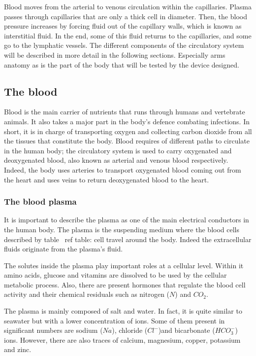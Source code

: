 Blood moves from the arterial to venous circulation within the capillaries. Plasma passes through capillaries that are only a thick cell in diameter. Then, the blood pressure increases by forcing fluid out of the capillary walls, which is known as interstitial fluid. In the end, some of this fluid returns to the capillaries, and some go to the lymphatic vessels. The different components of the circulatory system will be described in more detail in the following sections. Especially arms anatomy as is the part of the body that will be tested by the device designed. 

\subsection{The blood}
Blood is the main carrier of nutrients that runs through humans and vertebrate animals. It also takes a major part in the body's defence combating infections. In short, it is in charge of transporting oxygen and collecting carbon dioxide from all the tissues that constitute the body.  Blood requires of different paths to circulate in the human body; the circulatory system is used to carry oxygenated and deoxygenated blood, also known as arterial and venous blood respectively. Indeed, the body uses arteries to transport oxygenated blood coming out from the heart and uses veins to return deoxygenated blood to the heart.

\subsubsection{The blood plasma}
\label{section literature 1.1}
It is important to describe the plasma as one of the main electrical conductors in the human body. The plasma is the suspending medium where the blood cells described by table \ ref {table: cell} travel around the body. Indeed the extracellular fluids originate from the plasma's fluid.

The solutes inside the plasma play important roles at a cellular level. Within it amino acids, glucose and vitamins are dissolved to be used by the cellular metabolic process. Also, there are present hormones that regulate the blood cell activity and their chemical residuals such as nitrogen ($N$) and $CO_2$.

The plasma is mainly composed of salt and water. In fact, it is quite similar to seawater but with a lower concentration of ions. Some of them present in significant numbers are sodium ($Na$), chloride ($Cl^-$)and bicarbonate ($HCO_3^-$) ions. However, there are also traces of calcium, magnesium, copper, potassium and zinc.

